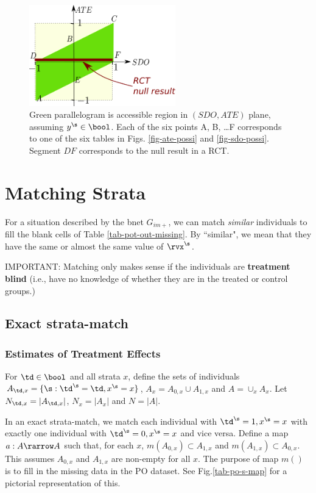 \begin{figure}[h!]
\centering
\includegraphics[width=2.5in]
{pot-out/sdo-ate-polytope.png}
\caption{
Green parallelogram
is accessible region in
$(SDO,ATE)$ plane,
assuming $y^\s\in \bool$.
Each of the
six points A, B, \ldots F
corresponds to one of the six tables
in Figs. \ref{fig-ate-possi}
and \ref{fig-sdo-possi}.
Segment $DF$
corresponds to the null
result in a RCT.
}
\label{fig-sdo-ate-polytope}
\end{figure}



\section{Matching Strata}

For a situation
described by
the bnet $G_{im+}$,
we can match {\it similar}
individuals to fill the blank cells of
 Table \ref{tab-pot-out-missing}.
By ``similar", we mean that
they have the same or almost the same
value of $\rvx^\s$.

IMPORTANT: Matching
only makes sense
if the individuals
are {\bf treatment blind} (i.e.,
have no knowledge
of whether they are
in the treated or control
groups.)


\subsection{Exact strata-match}

\subsubsection{Estimates of Treatment Effects}
\label{sec-estimates}
For $\td\in \bool$ and all strata $x$,
define the sets of individuals
$A_{\td,x}=\{\s: \td^\s=\td, x^\s=x\}$,
$A_x=A_{0,x}\cup A_{1,x}$ and $A=\cup_x A_x$.
Let $N_{\td,x}=|A_{\td,x}|$,
$N_x= |A_x|$ and $N=|A|$.

In an exact strata-match,
we match each individual with
$\td^\s=1, x^\s=x$
with
exactly
one individual
with $\td^\s=0, x^\s=x$
and vice versa.
Define a map $a:A\rarrow A$
such that,
for each $x$,
$m(A_{0,x})\subset A_{1,x}$ and
$m(A_{1,x})\subset A_{0,x}$.
This assumes $A_{0,x}$ and $A_{1,x}$
are non-empty for all $x$.
The purpose of map $m()$
is
to fill in the missing data in the
PO dataset. See Fig.\ref{tab-po-s-map}
for a pictorial representation of
this.

